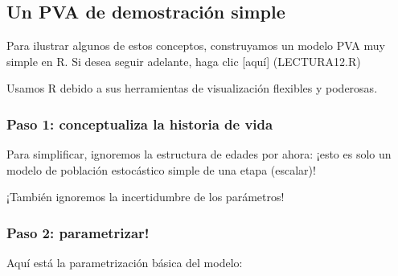 \documentclass[
]{article}
\begin{document}
\hypertarget{un-pva-de-demostraciuxf3n-simple}{%
\subsection{Un PVA de demostración
simple}\label{un-pva-de-demostraciuxf3n-simple}}

Para ilustrar algunos de estos conceptos, construyamos un modelo PVA muy
simple en R. Si desea seguir adelante, haga clic {[}aquí{]}
(LECTURA12.R)

Usamos R debido a sus herramientas de visualización flexibles y
poderosas.

\hypertarget{paso-1-conceptualiza-la-historia-de-vida}{%
\subsubsection{Paso 1: conceptualiza la historia de
vida}\label{paso-1-conceptualiza-la-historia-de-vida}}

Para simplificar, ignoremos la estructura de edades por ahora: ¡esto es
solo un modelo de población estocástico simple de una etapa (escalar)!

¡También ignoremos la incertidumbre de los parámetros!

\hypertarget{paso-2-parametrizar}{%
\subsubsection{Paso 2: parametrizar!}\label{paso-2-parametrizar}}

Aquí está la parametrización básica del modelo:
\end{document}
